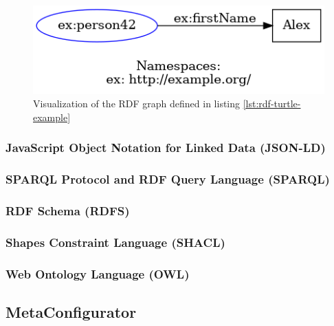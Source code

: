 \begin{figure}[!t]
    \centering
    \includegraphics[width=\columnwidth]{figures/rdf_graph_example}
    \caption{Visualization of the RDF graph defined in listing \ref{lst:rdf-turtle-example}}
    \label{fig:rdf_graph}
\end{figure}




\subsubsection{JavaScript Object Notation for Linked Data (JSON-LD)}


\subsubsection{SPARQL Protocol and RDF Query Language (SPARQL)}

\subsubsection{RDF Schema (RDFS)}


\subsubsection{Shapes Constraint Language (SHACL)}


\subsubsection{Web Ontology Language (OWL)}





\subsection{MetaConfigurator}